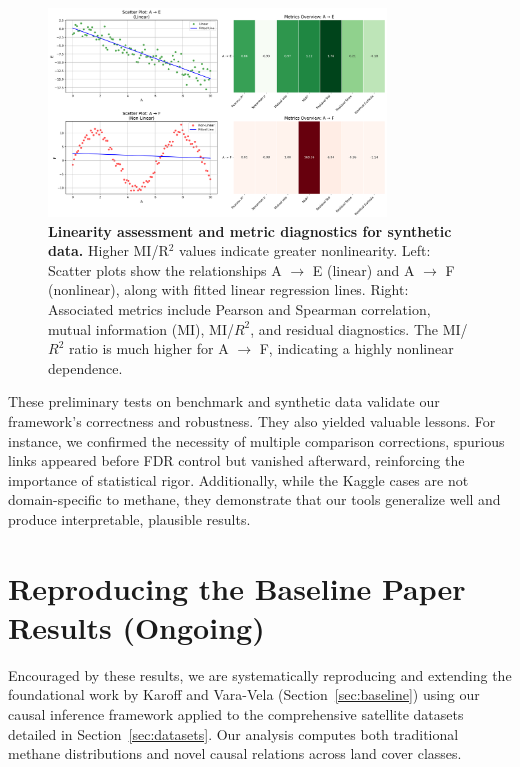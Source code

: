 \begin{figure}[h!]
	\centering
	\includegraphics[width=0.8\textwidth]{Images/linearity_visualization.png}
	\caption[Linearity analysis of synthetic causal links]{\textbf{Linearity assessment and metric diagnostics for synthetic data.} Higher MI/R$^2$ values indicate greater nonlinearity. Left: Scatter plots show the relationships A $\rightarrow$ E (linear) and A $\rightarrow$ F (nonlinear), along with fitted linear regression lines.
		Right: Associated metrics include Pearson and Spearman correlation, mutual information (MI), MI/$R^2$, and residual diagnostics. The MI/$R^2$ ratio is much higher for A $\rightarrow$ F, indicating a highly nonlinear dependence.}
	\label{fig:synthetic}
\end{figure}

These preliminary tests on benchmark and synthetic data validate our framework’s correctness and robustness. They also yielded valuable lessons. For instance, we confirmed the necessity of multiple comparison corrections, spurious links appeared before FDR control but vanished afterward, reinforcing the importance of statistical rigor. Additionally, while the Kaggle cases are not domain-specific to methane, they demonstrate that our tools generalize well and produce interpretable, plausible results.

\section{Reproducing the Baseline Paper Results (Ongoing)}
Encouraged by these results, we are systematically reproducing and extending the foundational work by Karoff and Vara-Vela (Section~\ref{sec:baseline}) using our causal inference framework applied to the comprehensive satellite datasets detailed in Section~\ref{sec:datasets}. Our analysis computes both traditional methane distributions and novel causal relations across land cover classes.

